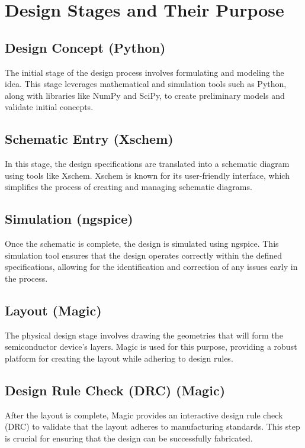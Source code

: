 \section{Design Stages and Their Purpose}

\subsection{Design Concept (Python)}

The initial stage of the design process involves formulating and modeling the idea. This stage leverages mathematical and simulation tools such as Python, along with libraries like NumPy and SciPy, to create preliminary models and validate initial concepts.

\subsection{Schematic Entry (Xschem)}

In this stage, the design specifications are translated into a schematic diagram using tools like Xschem. Xschem is known for its user-friendly interface, which simplifies the process of creating and managing schematic diagrams.

\subsection{Simulation (ngspice)}

Once the schematic is complete, the design is simulated using ngspice. This simulation tool ensures that the design operates correctly within the defined specifications, allowing for the identification and correction of any issues early in the process.

\subsection{Layout (Magic)}

The physical design stage involves drawing the geometries that will form the semiconductor device's layers. Magic is used for this purpose, providing a robust platform for creating the layout while adhering to design rules.

\subsection{Design Rule Check (DRC) (Magic)}

After the layout is complete, Magic provides an interactive design rule check (DRC) to validate that the layout adheres to manufacturing standards. This step is crucial for ensuring that the design can be successfully fabricated.

